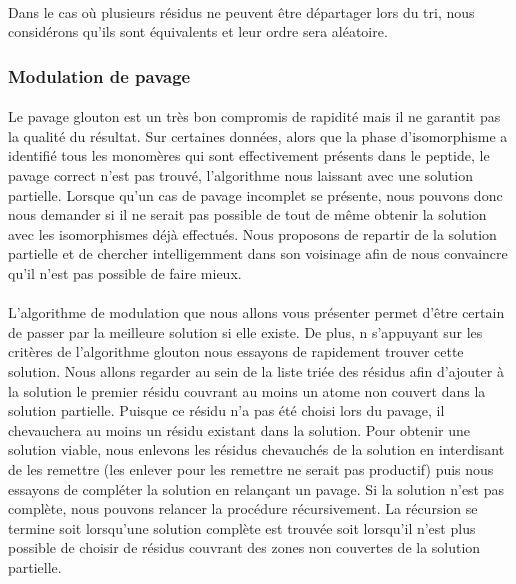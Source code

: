 \documentclass[12pt,french,twoside]{report}
\begin{document}
\paragraph{}Dans le cas où plusieurs résidus ne peuvent être départager lors du tri, nous considérons qu'ils sont équivalents et
leur ordre sera aléatoire.


\subsubsection{Modulation de pavage}

\paragraph{}Le pavage glouton est un très bon compromis de rapidité mais il ne garantit pas la qualité du résultat.
Sur certaines données, alors que la phase d'isomorphisme a identifié tous les monomères qui sont effectivement présents dans le
peptide, le pavage correct n'est pas trouvé, l'algorithme nous laissant avec une solution partielle.
Lorsque qu'un cas de pavage incomplet se présente, nous pouvons donc nous demander si il ne serait pas possible de tout de même
obtenir la solution avec les isomorphismes déjà effectués.
Nous proposons de repartir de la solution partielle et de chercher intelligemment dans son voisinage afin de nous convaincre qu'il
n'est pas possible de faire mieux.

\paragraph{}L'algorithme de modulation que nous allons vous présenter permet d'être certain de passer par la meilleure solution si
elle existe.
De plus, n s'appuyant sur les critères de l'algorithme glouton nous essayons de rapidement trouver cette solution.
Nous allons regarder au sein de la liste triée des résidus afin d'ajouter à la solution le premier résidu couvrant au moins un
atome non couvert dans la solution partielle.
Puisque ce résidu n'a pas été choisi lors du pavage, il chevauchera au moins un résidu existant dans la solution.
Pour obtenir une solution viable, nous enlevons les résidus chevauchés de la solution en interdisant de les remettre (les enlever
pour les remettre ne serait pas productif) puis nous essayons de compléter la solution en relançant un pavage.
Si la solution n'est pas complète, nous pouvons relancer la procédure récursivement.
La récursion se termine soit lorsqu'une solution complète est trouvée soit lorsqu'il n'est plus possible de choisir de résidus
couvrant des zones non couvertes de la solution partielle.
\end{document}
